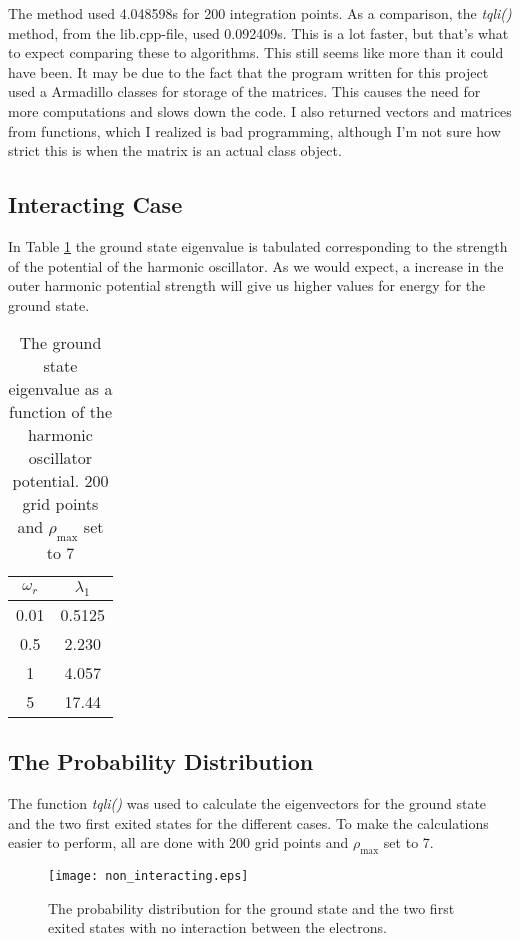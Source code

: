 \documentclass[11pt, a4paper]{article}
\begin{document}
The method used 4.048598s for 200 integration points. As a comparison, the \textit{tqli()} method, from the lib.cpp-file, used 0.092409s. This is a lot faster, but that's what to expect comparing these to algorithms. This still seems like more than it could have been. It may be due to the fact that the program written for this project used a Armadillo classes for storage of the matrices. This causes the need for more computations and slows down the code. I also returned vectors and matrices from functions, which I realized is bad programming, although I'm not sure how strict this is when the matrix is an actual class object.

\clearpage
\subsection{Interacting Case}
In Table \ref{table_eigvalsi} the ground state eigenvalue is tabulated corresponding to the strength of the potential of the harmonic oscillator. As we would expect, a increase in the outer harmonic potential strength will give us higher values for energy for the ground state. 
\begin{table}[ht!]
\centering
\begin{tabular}{c|c}
 $\omega_r$ & $\lambda_1$ \\ \hline
 0.01&0.5125\\
 0.5&2.230\\
 1&4.057\\
 5&17.44
\end{tabular}
\caption{The ground state eigenvalue as a function of the harmonic oscillator potential. 200 grid points and $\rho_\text{max}$ set to 7}
\label{table_eigvalsi}
\end{table}

\subsection{The Probability Distribution}
The function \textit{tqli()} was used to calculate the eigenvectors for the ground state and the two first exited states for the different cases. To make the calculations easier to perform, all are done with 200 grid points and $\rho_\text{max}$ set to 7.
\begin{figure}[ht!]
\texttt{[image: non\_interacting.eps]}
\caption{The probability distribution for the ground state and the two first exited states with no interaction between the electrons.}
\end{figure}
\end{document}

